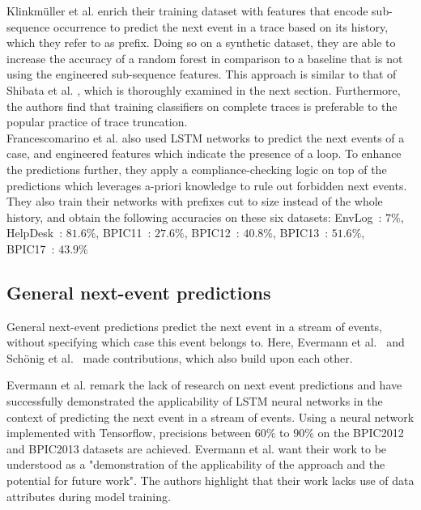 Klinkmüller et al. enrich their training dataset with features that encode sub-sequence occurrence \cite{klinkmuller2018reliablemonitoring} to predict the next event in a trace based on its history, which they refer to as prefix. Doing so on a synthetic dataset, they are able to increase the accuracy of a random forest in comparison to a baseline that is not using the engineered sub-sequence features. This approach is similar to that of Shibata et al. \cite{shibata2016bipartite}, which is thoroughly examined in the next section. Furthermore, the authors find that training classifiers on complete traces is preferable to the popular practice of trace truncation.\\

Francescomarino et al. also used LSTM networks to predict the next events of a case, and engineered features which indicate the presence of a loop. To enhance the predictions further, they apply a compliance-checking logic on top of the predictions which leverages a-priori knowledge to rule out forbidden next events. They also train their networks with prefixes cut to size instead of the whole history, and obtain the following accuracies on these six datasets:
EnvLog~\cite{EnvLog}: $7\%$, HelpDesk~\cite{Helpdesk}: $81.6\%$, BPIC11~\cite{BPIC2011}: $27.6\%$, BPIC12~\cite{BPIC2012}: $40.8\%$, BPIC13~\cite{BPIC2013}: $51.6\%$, BPIC17~\cite{BPIC2017}: $43.9\%$

\subsection*{General next-event predictions}
General next-event predictions predict the next event in a stream of events, without specifying which case this event belongs to. Here, Evermann et al.~\cite{evermann2016} and Schönig et al.~\cite{schoenig2018} made contributions, which also build upon each other.

Evermann et al. remark the lack of research on next event predictions and have successfully demonstrated the applicability of LSTM neural networks in the context of predicting the next event in a stream of events. Using a neural network implemented with Tensorflow, precisions between $60\%$ to $90\%$ on the BPIC2012 and BPIC2013 datasets are achieved. Evermann et al. want their work to be understood as a "demonstration of the applicability of the approach and the potential for future work". The authors highlight that their work lacks use of data attributes during model training.

